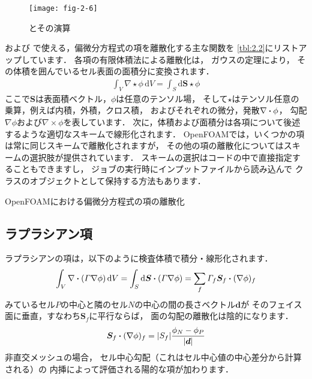 \begin{figure}[ht]
 \texttt{[image: fig-2-6]}
 \caption{とその演算}
 \label{fig:2.6}
\end{figure}


%
%
および
%
%
で使える，偏微分方程式の項を離散化する主な関数を
\autoref{tbl:2.2}にリストアップしています．
各項の有限体積法による離散化は，
%
ガウスの定理により，
その体積を囲んでいるセル表面の面積分に変換されます．
\begin{align}
 \label{eq:2.13}
 \int_{V}\nabla \star \phi\,\mathrm{d}V
 = \int_{S}\mathrm{d}\bm{S} \star \phi
\end{align}
ここで$\bm{S}$は表面積ベクトル，$\phi$は任意のテンソル場，
そして$\star$はテンソル任意の乗算，例えば内積，外積，クロス積，
およびそれぞれの微分，発散$\nabla \inProd \phi$，
勾配$\nabla\phi$および$\nabla \times \phi$を表しています．
次に，体積および面積分は各項について後述するような適切なスキームで線形化されます．
OpenFOAMでは，いくつかの項は常に同じスキームで離散化されますが，
その他の項の離散化についてはスキームの選択肢が提供されています．
スキームの選択はコードの中で直接指定することもできますし，
ジョブの実行時にインプットファイルから読み込んで
%
%
クラスのオブジェクトとして保持する方法もあります．


\begin{table}[ht]
 
 \caption{OpenFOAMにおける偏微分方程式の項の離散化}
 \label{tbl:2.2}
\end{table}


\subsection{ラプラシアン項}
\label{ssec:2.4.1}
%
ラプラシアンの項は，以下のように検査体積で積分・線形化されます．
\begin{align}
 \label{eq:2.14}
 \int_{V}\nabla \inProd (\varGamma\nabla\phi)\,\mathrm{d}V
 = \int_{S}\mathrm{d}\bm{S} \inProd (\varGamma\nabla\phi)
 = \sum_{f}\varGamma_{f}\bm{S}_{f} \inProd (\nabla\phi)_{f}
\end{align}
みているセル$P$の中心と隣のセル$N$の中心の間の長さベクトル$\bm{d}$が
そのフェイス面に垂直，すなわち$\bm{S}_{f}$に平行ならば，
面の勾配の離散化は陰的になります．
\begin{align}
 \label{eq:2.15}
 \bm{S}_{f} \inProd (\nabla\phi)_{f}
 = |S_{f}|\frac{\phi_{N} - \phi_{P}}{|\bm{d}|}
\end{align}
非直交メッシュの場合，
セル中心勾配（これはセル中心値の中心差分から計算される）の
内挿によって評価される陽的な項が加わります．


